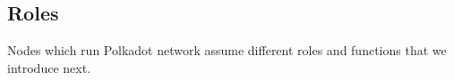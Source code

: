 



\subsection{Roles}
Nodes which run Polkadot network assume different roles and functions that we introduce next.

  
